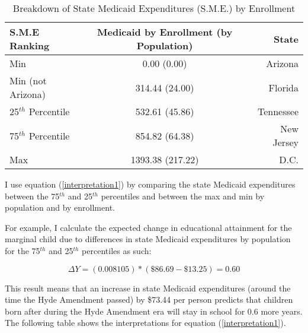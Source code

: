             \begin{table}[H]
                \caption{Breakdown of State Medicaid Expenditures (S.M.E.) by Enrollment}
                \centering\footnotesize{
                \begin{tabular}{lcr}
                \hline
                S.M.E Ranking & Medicaid by Enrollment (by Population) & State\\
                \hline
                Min & 0.00 (0.00) & Arizona\\
                Min (not Arizona) & 314.44 (24.00) & Florida\\
                25$^{th}$ Percentile & 532.61 (45.86) & Tennessee\\
                75$^{th}$ Percentile & 854.82 (64.38) & New Jersey\\
                Max & 1393.38 (217.22) & D.C.\\
                \hline
                \end{tabular}}
            \end{table}

        I use equation (\ref{interpretation1}) by comparing the state Medicaid expenditures between the 75$^{th}$ and 25$^{th}$ percentiles and between the max and min by population and by enrollment.

        For example, I calculate the expected change in educational attainment for the marginal child due to differences in state Medicaid expenditures by population for the 75$^{th}$ and 25$^{th}$ percentiles as such:

            \begin{equation}\label{interpretation3}
                \Delta Y = (0.008105)*(\$86.69-\$13.25) = 0.60
            \end{equation}

        This result means that an increase in state Medicaid expenditures (around the time the Hyde Amendment passed) by \$73.44 per person predicts that children born after during the Hyde Amendment era will stay in school for 0.6 more years. The following table shows the interpretations for equation (\ref{interpretation1}).

